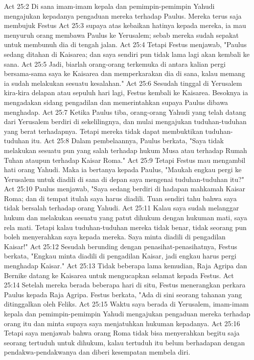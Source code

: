 Act 25:2  Di sana imam-imam kepala dan pemimpin-pemimpin Yahudi mengajukan kepadanya pengaduan mereka terhadap Paulus. Mereka terus saja membujuk Festus
Act 25:3  supaya atas kebaikan hatinya kepada mereka, ia mau menyuruh orang membawa Paulus ke Yerusalem; sebab mereka sudah sepakat untuk membunuh dia di tengah jalan.
Act 25:4  Tetapi Festus menjawab, "Paulus sedang ditahan di Kaisarea; dan saya sendiri pun tidak lama lagi akan kembali ke sana.
Act 25:5  Jadi, biarlah orang-orang terkemuka di antara kalian pergi bersama-sama saya ke Kaisarea dan memperkarakan dia di sana, kalau memang ia sudah melakukan sesuatu kesalahan."
Act 25:6  Sesudah tinggal di Yerusalem kira-kira delapan atau sepuluh hari lagi, Festus kembali ke Kaisarea. Besoknya ia mengadakan sidang pengadilan dan memerintahkan supaya Paulus dibawa menghadap.
Act 25:7  Ketika Paulus tiba, orang-orang Yahudi yang telah datang dari Yerusalem berdiri di sekelilingnya, dan mulai mengajukan tuduhan-tuduhan yang berat terhadapnya. Tetapi mereka tidak dapat membuktikan tuduhan-tuduhan itu.
Act 25:8  Dalam pembelaannya, Paulus berkata, "Saya tidak melakukan sesuatu pun yang salah terhadap hukum Musa atau terhadap Rumah Tuhan ataupun terhadap Kaisar Roma."
Act 25:9  Tetapi Festus mau mengambil hati orang Yahudi. Maka ia bertanya kepada Paulus, "Maukah engkau pergi ke Yerusalem untuk diadili di sana di depan saya mengenai tuduhan-tuduhan itu?"
Act 25:10  Paulus menjawab, "Saya sedang berdiri di hadapan mahkamah Kaisar Roma; dan di tempat itulah saya harus diadili. Tuan sendiri tahu bahwa saya tidak bersalah terhadap orang Yahudi.
Act 25:11  Kalau saya sudah melanggar hukum dan melakukan sesuatu yang patut dihukum dengan hukuman mati, saya rela mati. Tetapi kalau tuduhan-tuduhan mereka tidak benar, tidak seorang pun boleh menyerahkan saya kepada mereka. Saya minta diadili di pengadilan Kaisar!"
Act 25:12  Sesudah berunding dengan penasihat-penasihatnya, Festus berkata, "Engkau minta diadili di pengadilan Kaisar, jadi engkau harus pergi menghadap Kaisar."
Act 25:13  Tidak beberapa lama kemudian, Raja Agripa dan Bernike datang ke Kaisarea untuk mengucapkan selamat kepada Festus.
Act 25:14  Setelah mereka berada beberapa hari di situ, Festus menerangkan perkara Paulus kepada Raja Agripa. Festus berkata, "Ada di sini seorang tahanan yang ditinggalkan oleh Feliks.
Act 25:15  Waktu saya berada di Yerusalem, imam-imam kepala dan pemimpin-pemimpin Yahudi mengajukan pengaduan mereka terhadap orang itu dan minta supaya saya menjatuhkan hukuman kepadanya.
Act 25:16  Tetapi saya menjawab bahwa orang Roma tidak bisa menyerahkan begitu saja seorang tertuduh untuk dihukum, kalau tertuduh itu belum berhadapan dengan pendakwa-pendakwanya dan diberi kesempatan membela diri.
